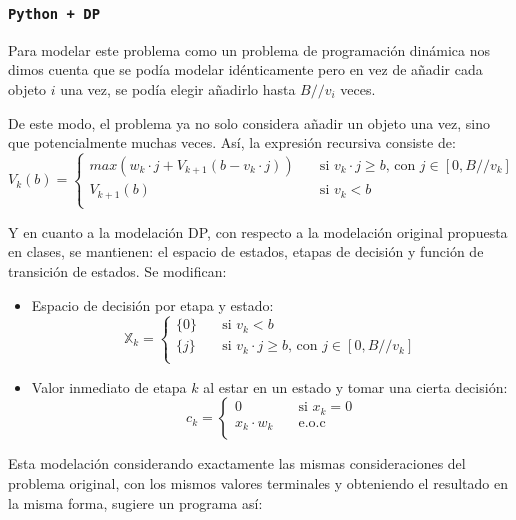 \documentclass[letterpaper,10pt]{article}
\begin{document}
  \subsubsection{\texttt{Python + DP}}
  
  Para modelar este problema como un problema de programación dinámica nos dimos cuenta que se podía modelar idénticamente pero en vez de añadir cada objeto $i$ una vez, se podía elegir añadirlo hasta $B // v_i$ veces.
  
  De este modo, el problema ya no solo considera añadir un objeto una vez, sino que potencialmente muchas veces. Así, la expresión recursiva consiste de:
  \[
    V_{k}(b) =
         \begin{cases}
           max(w_k \cdot j + V_{k+1}(b-v_k \cdot j)) & \quad\text{si }v_k \cdot  j \ge b \text{, con } j \in [0, B // v_k] \\
           V_{k+1}(b) & \quad\text{si }v_k < b  \\
         \end{cases}
  \]
  
  Y en cuanto a la modelación DP, con respecto a la modelación original propuesta en clases, se mantienen: el espacio de estados, etapas de decisión y función de transición de estados. Se modifican:
  
  \begin{itemize}
      \item Espacio de decisión por etapa y estado: \[\mathds{X}_k =
         \begin{cases}
           \{0\} & \quad\text{si }v_k < b  \\
            \{j\} & \quad\text{si }v_k \cdot  j \ge b \text{, con } j \in [0, B // v_k] \\
         \end{cases}
  \]
      \item Valor inmediato de etapa $k$ al estar en un estado y tomar una cierta decisión: \[c_k =
         \begin{cases}
           0 & \quad\text{si }x_k = 0  \\
           x_k \cdot w_k & \quad\text{e.o.c} \\
         \end{cases}
  \]
  \end{itemize}  
  
  Esta modelación considerando exactamente las mismas consideraciones del problema original, con los mismos valores terminales y obteniendo el resultado en la misma forma, sugiere un programa así:
  
\end{document}
